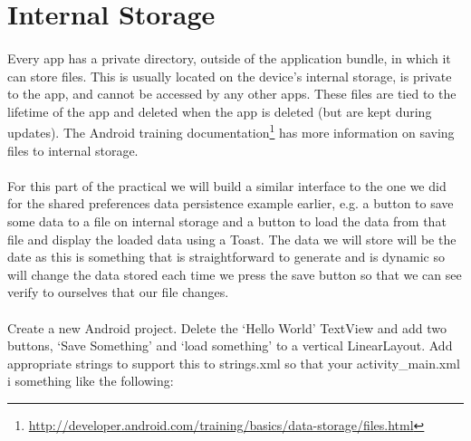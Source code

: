 \section{Internal Storage}
\paragraph{} Every app has a private directory, outside of the application bundle, in which it can store files. This is usually located on the device's internal storage, is private to the app, and cannot be accessed by any other apps. These files are tied to the lifetime of the app and deleted when the app is deleted (but are kept during updates). The Android training documentation\footnote{\url{http://developer.android.com/training/basics/data-storage/files.html}} has more information on saving files to internal storage.

\paragraph{} For this part of the practical we will build a similar interface to the one we did for the shared preferences data persistence example earlier, e.g. a button to save some data to a file on internal storage and a button to load the data from that file and display the loaded data using a Toast. The data we will store will be the date as this is something that is straightforward to generate and is dynamic so will change the data stored each time we press the save button so that we can see verify to ourselves that our file changes.

\paragraph{} Create a new Android project. Delete the `Hello World' TextView and add two buttons, `Save Something' and `load something' to a vertical LinearLayout. Add appropriate strings to support this to strings.xml so that your activity\_main.xml i something like the following:

